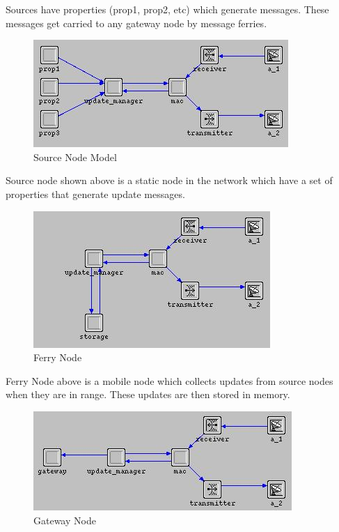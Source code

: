 %

Sources have properties (prop1, prop2, etc) which generate messages. These messages get carried to any gateway node by message ferries.

\begin{figure}[h]
    \centering
    \includegraphics[width=.5\textwidth]{images/source}
    \caption{Source Node Model}
    \label{fig:source}
\end{figure}

Source node shown above is a static node in the network which have a set of properties that generate update messages. 	

\begin{figure}[h]
    \centering
    \includegraphics[width=.5\textwidth]{images/ferry}
    \caption{Ferry Node}
    \label{fig:Ferry}
\end{figure}

Ferry Node above is a mobile node which collects updates from source nodes when they are in range. These updates are then stored in memory.

\begin{figure}[h]
    \centering
    \includegraphics[width=.5\textwidth]{images/gateway}
    \caption{Gateway Node}
    \label{fig:Gateway}
\end{figure}

